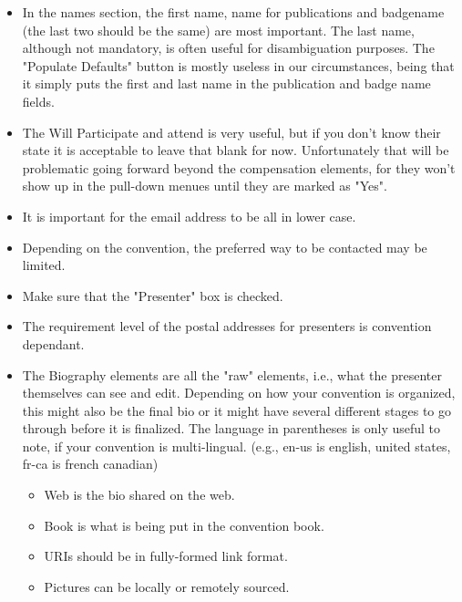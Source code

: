\documentclass[captions=tablesignature]{scrartcl}
\begin{document}
\begin{itemize}
\item In the names section, the first name, name for publications and
badgename (the last two should be the same) are most
important. The last name, although not mandatory, is often useful
for disambiguation purposes.  The "Populate Defaults" button is
mostly useless in our circumstances, being that it simply puts
the first and last name in the publication and badge name
fields.

\item The Will Participate and attend is very useful, but if you don't
know their state it is acceptable to leave that blank for now.
Unfortunately that will be problematic going forward beyond the
compensation elements, for they won't show up in the pull-down
menues until they are marked as "Yes".

\item It is important for the email address to be all in lower case.

\item Depending on the convention, the preferred way to be contacted
may be limited.

\item Make sure that the "Presenter" box is checked.

\item The requirement level of the postal addresses for presenters is
convention dependant.

\item The Biography elements are all the "raw" elements, i.e., what the
presenter themselves can see and edit.  Depending on how your
convention is organized, this might also be the final bio or it
might have several different stages to go through before it is
finalized.  The language in parentheses is only useful to note,
if your convention is multi-lingual. (e.g., en-us is english,
united states, fr-ca is french canadian)

\begin{itemize}
\item Web is the bio shared on the web.

\item Book is what is being put in the convention book.

\item URIs should be in fully-formed link format.

\item Pictures can be locally or remotely sourced.


\end{itemize}
\end{itemize}
\end{document}
